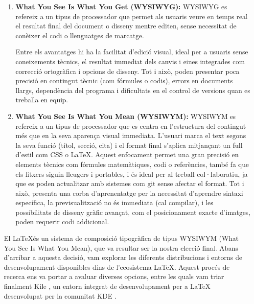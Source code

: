  \begin{enumerate}
    \item \textbf{What You See Is What You Get (WYSIWYG):} WYSIWYG es refereix a un tipus de processador que permet als usuaris veure en temps real el resultat final del document o disseny mentre editen, sense necessitat de conèixer el codi o llenguatges de marcatge.

    Entre els avantatges hi ha la facilitat d'edició visual, ideal per a usuaris sense coneixements tècnics, el resultat immediat dels canvis i eines integrades com correcció ortogràfica i opcions de disseny. Tot i això, poden presentar poca precisió en contingut tècnic (com fórmules o codis), errors en documents llargs, dependència del programa i dificultats en el control de versions quan es treballa en equip.

    \item \textbf{What You See Is What You Mean (WYSIWYM):} WYSIWYM es refereix a un tipus de processador que es centra en l'estructura del contingut més que en la seva aparença visual immediata. L'usuari marca el text segons la seva funció (títol, secció, cita) i el format final s'aplica mitjançant un full d'estil com CSS o LaTeX. Aquest enfocament permet una gran precisió en elements tècnics com fórmules matemàtiques, codi o referències, també fa que els fitxers siguin lleugers i portables, i és ideal per al treball col·laboratiu, ja que es poden actualitzar amb sistemes com git sense afectar el format. Tot i això, presenta una corba d'aprenentatge per la necessitat d'aprendre sintaxi específica, la previsualització no és immediata (cal compilar), i les possibilitats de disseny gràfic avançat, com el posicionament exacte d'imatges, poden requerir codi addicional.
\end{enumerate}

El \LaTeX és un sistema de composició tipogràfica de tipus WYSIWYM (What You See Is What You Mean), que va resultar ser la nostra elecció final. Abans d’arribar a aquesta decisió, vam explorar les diferents distribucions i entorns de desenvolupament disponibles dins de l’ecosistema \LaTeX. Aquest procés de recerca ens va portar a avaluar diverses opcions, entre les quals vam triar finalment Kile \cite{Kile}, un entorn integrat de desenvolupament per a LaTeX desenvolupat per la comunitat KDE \cite{KDE}.\\

